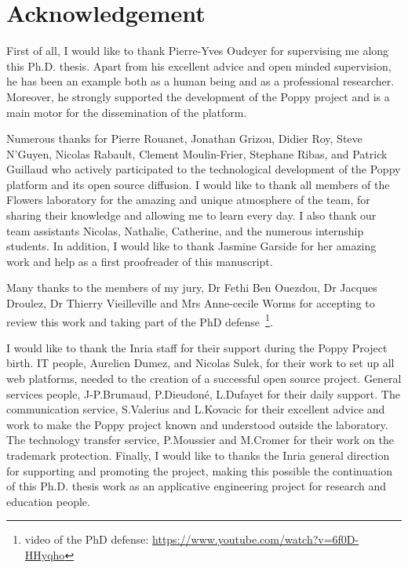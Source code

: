 %
\chapter*{Acknowledgement}
\label{sec:acknowledgement}
\vspace*{-10mm}


First of all, I would like to thank Pierre-Yves Oudeyer for supervising me along this Ph.D. thesis.  Apart from his excellent advice and open minded supervision, he has been an example both as a human being and as a professional researcher. Moreover, he strongly supported the development of the Poppy project and is a main motor for the dissemination of the platform.

Numerous thanks for Pierre Rouanet, Jonathan Grizou, Didier Roy, Steve N'Guyen, Nicolas Rabault, Clement Moulin-Frier, Stephane Ribas, and Patrick Guillaud who actively participated to the technological development of the Poppy platform and its open source diffusion. I would like to thank all members of the Flowers laboratory for the amazing and unique atmosphere of the team, for sharing their knowledge and allowing me to learn every day. I also thank our team assistants Nicolas, Nathalie, Catherine, and the numerous internship students. In addition, I would like to thank Jasmine Garside for her amazing work and help as a first proofreader of this manuscript.

Many thanks to the members of my jury, Dr Fethi Ben Ouezdou, Dr Jacques Droulez, Dr Thierry Vieilleville and Mrs Anne-cecile Worms for accepting to review this work and taking part of the PhD defense~\footnote{video of the PhD defense: \url{https://www.youtube.com/watch?v=6f0D-HHyqho}}.

I would like to thank the Inria staff for their support during the Poppy Project birth. IT people, Aurelien Dumez, and Nicolas Sulek, for their work to set up all web platforms, needed to the creation of a successful open source project. General services people, J-P.Brumaud, P.Dieudoné, L.Dufayet for their daily support. The communication service, S.Valerius and L.Kovacic for their excellent advice and work to make the Poppy project known and understood outside the laboratory. The technology transfer service, P.Moussier and M.Cromer for their work on the trademark protection.
Finally, I would like to thanks the Inria general direction for supporting and promoting the project, making this possible the continuation of this Ph.D. thesis work as an applicative engineering project for research and education people.


